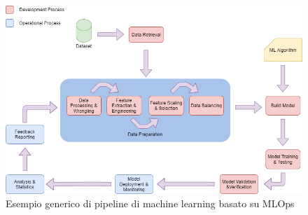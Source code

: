 \begin{figure}
    \centering
    \includegraphics[width=1\textwidth]{figure/Ml Pipeline.png}
    \caption{Esempio generico di pipeline di machine learning basato su MLOps}
\end{figure}
\newpage